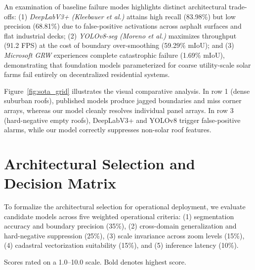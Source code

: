 \documentclass[conference]{IEEEtran}
\begin{document}
An examination of baseline failure modes highlights distinct architectural trade-offs: (1) \textit{DeepLabV3+ (Kleebauer et al.)} attains high recall (83.98\%) but low precision (68.81\%) due to false-positive activations across asphalt surfaces and flat industrial decks; (2) \textit{YOLOv8-seg (Moreno et al.)} maximizes throughput (91.2 FPS) at the cost of boundary over-smoothing (59.29\% mIoU); and (3) \textit{Microsoft GRW} experiences complete catastrophic failure (1.69\% mIoU), demonstrating that foundation models parameterized for coarse utility-scale solar farms fail entirely on decentralized residential systems.

Figure~\ref{fig:sota_grid} illustrates the visual comparative analysis. In row 1 (dense suburban roofs), published models produce jagged boundaries and miss corner arrays, whereas our model cleanly resolves individual panel arrays. In row 3 (hard-negative empty roofs), DeepLabV3+ and YOLOv8 trigger false-positive alarms, while our model correctly suppresses non-solar roof features.

\section{Architectural Selection and Decision Matrix}
To formalize the architectural selection for operational deployment, we evaluate candidate models across five weighted operational criteria: (1) segmentation accuracy and boundary precision (35\%), (2) cross-domain generalization and hard-negative suppression (25\%), (3) scale invariance across zoom levels (15\%), (4) cadastral vectorization suitability (15\%), and (5) inference latency (10\%).

\begin{table}[t]
\centering
\caption{Multi-Criteria Architectural Decision Matrix}
\label{tab:decision}
\vspace{1mm}
\raggedright\footnotesize{Scores rated on a 1.0--10.0 scale. Bold denotes highest score.}
\end{table}
\end{document}
